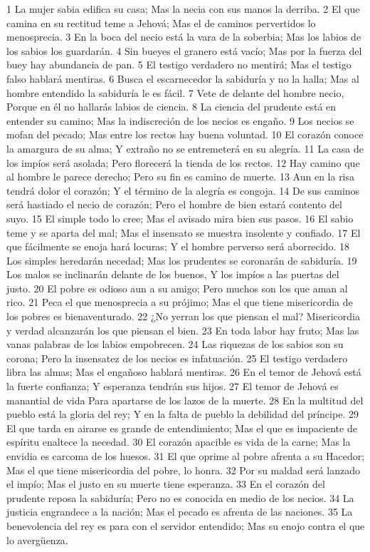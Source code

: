 1 La mujer sabia edifica su casa;
Mas la necia con sus manos la derriba.
2 El que camina en su rectitud teme a Jehová;
Mas el de caminos pervertidos lo menosprecia.
3 En la boca del necio está la vara de la soberbia;
Mas los labios de los sabios los guardarán.
4 Sin bueyes el granero está vacío;
Mas por la fuerza del buey hay abundancia de pan.
5 El testigo verdadero no mentirá;
Mas el testigo falso hablará mentiras.
6 Busca el escarnecedor la sabiduría y no la halla;
Mas al hombre entendido la sabiduría le es fácil.
7 Vete de delante del hombre necio,
Porque en él no hallarás labios de ciencia.
8 La ciencia del prudente está en entender su camino;
Mas la indiscreción de los necios es engaño.
9 Los necios se mofan del pecado;
Mas entre los rectos hay buena voluntad.
10 El corazón conoce la amargura de su alma;
Y extraño no se entremeterá en su alegría.
11 La casa de los impíos será asolada;
Pero florecerá la tienda de los rectos.
12 Hay camino que al hombre le parece derecho;
Pero su fin es camino de muerte. 
13 Aun en la risa tendrá dolor el corazón;
Y el término de la alegría es congoja.
14 De sus caminos será hastiado el necio de corazón;
Pero el hombre de bien estará contento del suyo.
15 El simple todo lo cree;
Mas el avisado mira bien sus pasos.
16 El sabio teme y se aparta del mal;
Mas el insensato se muestra insolente y confiado.
17 El que fácilmente se enoja hará locuras;
Y el hombre perverso será aborrecido.
18 Los simples heredarán necedad;
Mas los prudentes se coronarán de sabiduría.
19 Los malos se inclinarán delante de los buenos,
Y los impíos a las puertas del justo.
20 El pobre es odioso aun a su amigo;
Pero muchos son los que aman al rico.
21 Peca el que menosprecia a su prójimo;
Mas el que tiene misericordia de los pobres es bienaventurado.
22 ¿No yerran los que piensan el mal?
Misericordia y verdad alcanzarán los que piensan el bien.
23 En toda labor hay fruto;
Mas las vanas palabras de los labios empobrecen.
24 Las riquezas de los sabios son su corona;
Pero la insensatez de los necios es infatuación.
25 El testigo verdadero libra las almas;
Mas el engañoso hablará mentiras.
26 En el temor de Jehová está la fuerte confianza;
Y esperanza tendrán sus hijos.
27 El temor de Jehová es manantial de vida
Para apartarse de los lazos de la muerte.
28 En la multitud del pueblo está la gloria del rey;
Y en la falta de pueblo la debilidad del príncipe.
29 El que tarda en airarse es grande de entendimiento;
Mas el que es impaciente de espíritu enaltece la necedad.
30 El corazón apacible es vida de la carne;
Mas la envidia es carcoma de los huesos.
31 El que oprime al pobre afrenta a su Hacedor;
Mas el que tiene misericordia del pobre, lo honra.
32 Por su maldad será lanzado el impío;
Mas el justo en su muerte tiene esperanza.
33 En el corazón del prudente reposa la sabiduría;
Pero no es conocida en medio de los necios.
34 La justicia engrandece a la nación;
Mas el pecado es afrenta de las naciones.
35 La benevolencia del rey es para con el servidor entendido;
Mas su enojo contra el que lo avergüenza.

